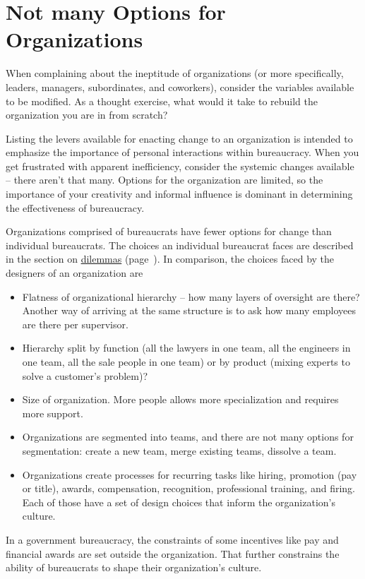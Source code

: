 \section{Not many Options for Organizations}

When complaining about the ineptitude of organizations (or more specifically, leaders, managers, subordinates, and coworkers), consider the variables available to be modified. As a thought exercise, what would it take to rebuild the organization you are in from scratch? 

Listing the levers available for enacting change to an organization is intended to emphasize the importance of personal interactions within bureaucracy. When you get frustrated with apparent inefficiency, consider the systemic changes available -- there aren't that many. Options for the organization are limited, so the importance of your creativity and informal influence is dominant in determining the effectiveness of bureaucracy.

Organizations comprised of bureaucrats have fewer options for change than individual bureaucrats. The choices an individual bureaucrat faces are described in the section on 
\hyperref[sec:dilemma-trilemma]{dilemmas}
(page~\pageref{sec:dilemma-trilemma}).
In comparison, the choices faced by the designers of an organization are
\begin{itemize}
    \item Flatness of organizational hierarchy -- how many layers of oversight are there? Another way of arriving at the same structure is to ask how many employees are there per supervisor.
    \item Hierarchy split by function (all the lawyers in one team, all the engineers in one team, all the sale people in one team) or by product (mixing experts to solve a customer's problem)?
    \item Size of organization. More people allows more specialization and requires more support. 
    \item Organizations are segmented into teams, and there are not many options for segmentation: create a new team, merge existing teams, dissolve a team.
    \item Organizations create processes for recurring tasks like hiring, promotion (pay or title), awards, compensation, recognition, professional training, and firing. Each of those have a set of design choices that inform the organization's culture.
\end{itemize}
In a government bureaucracy, the constraints of some incentives like pay and financial awards are set outside the organization. That further constrains the ability of bureaucrats to shape their organization's culture.

